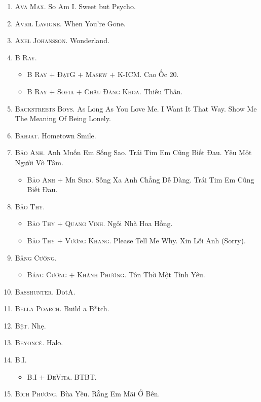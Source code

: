 \documentclass[oneside]{book}
\numberwithin{equation}{section}
\begin{document}
\begin{enumerate}
\begin{itemize}
	\end{itemize}
	\item \textsc{Ava Max.} So Am I. Sweet but Psycho.	
	\item \textsc{Avril Lavigne.} When You're Gone.
	\item \textsc{Axel Johansson.} Wonderland.
	\item \textsc{B Ray.}
	\begin{itemize}
		\item \textsc{B Ray $+$ ĐạtG $+$ Masew $+$ K-ICM.} Cao Ốc 20.
		\item \textsc{B Ray $+$ Sofia $+$ Châu Đăng Khoa.} Thiêu Thân.
	\end{itemize}
	\item \textsc{Backstreets Boys.} As Long As You Love Me. I Want It That Way. Show Me The Meaning Of Being Lonely.
	\item \textsc{Bahjat.} Hometown Smile.
	\item \textsc{Bảo Anh.} Anh Muốn Em Sống Sao. Trái Tim Em Cũng Biết Đau. Yêu Một Người Vô Tâm.
	\begin{itemize}
		\item \textsc{Bảo Anh $+$ Mr Siro.} Sống Xa Anh Chẳng Dễ Dàng. Trái Tim Em Cũng Biết Đau.
	\end{itemize}
	\item \textsc{Bảo Thy.}
	\begin{itemize}
		\item \textsc{Bảo Thy $+$ Quang Vinh.} Ngôi Nhà Hoa Hồng.
		\item \textsc{Bảo Thy $+$ Vương Khang.} Please Tell Me Why. Xin Lỗi Anh (Sorry).
	\end{itemize}
	\item \textsc{Bằng Cường.}
	\begin{itemize}
		\item \textsc{Bằng Cường $+$ Khánh Phương.} Tôn Thờ Một Tình Yêu.
	\end{itemize}
	\item \textsc{Basshunter.} DotA.
	\item \textsc{Bella Poarch.} Build a B*tch.
	\item \textsc{Bệt.} Nhẹ.
	\item \textsc{Beyonc\'e.} Halo.
	\item \textsc{B.I.}
	\begin{itemize}
		\item \textsc{B.I $+$ DeVita.} BTBT.
	\end{itemize}
	\item \textsc{Bích Phương.} Bùa Yêu. Rằng Em Mãi Ở Bên.

\end{enumerate}
\end{document}

